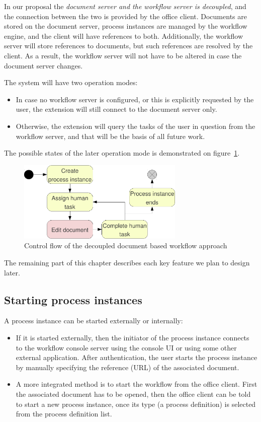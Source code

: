 In our proposal the \emph{document server and the workflow server is
decoupled}, and the connection between the two is provided by the office
client. Documents are stored on the document server, process instances are
managed by the workflow engine, and the client will have references to both.
Additionally, the workflow server will store references to documents, but such
references are resolved by the client. As a result, the workflow server will
not have to be altered in case the document server changes.

The system will have two operation modes:

\begin{itemize}
\item In case no workflow server is configured, or this is explicitly requested
by the user, the extension will still connect to the document server only.
\item Otherwise, the extension will query the tasks of the user in question
from the workflow server, and that will be the basis of all future work.
\end{itemize}

The possible states of the later operation mode is demonstrated on
figure~\ref{fig:decoupled-approach-workflow}.

\begin{figure}[H]
\centering
\includegraphics[width=300px,keepaspectratio]{decoupled-approach-workflow.pdf}
\caption{Control flow of the decoupled document based workflow approach}
\label{fig:decoupled-approach-workflow}
\end{figure}

The remaining part of this chapter describes each key feature we plan to design
later.

\subsection*{Starting process instances}

A process instance can be started externally or internally:

\begin{itemize}
\item If it is started externally, then the initiator of the process instance
connects to the workflow console server using the console UI or using some
other external application. After authentication, the user starts the process
instance by manually specifying the reference (URL) of the associated document.
\item A more integrated method is to start the workflow from the office client.
First the associated document has to be opened, then the office client can be
told to start a new process instance, once its type (a process definition) is
selected from the process definition list.
\end{itemize}


